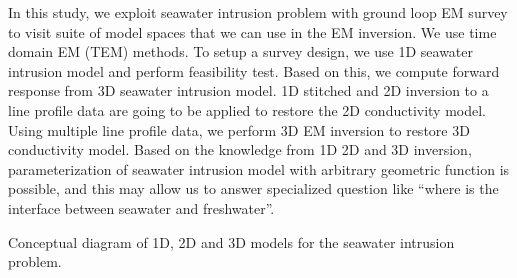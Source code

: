 \documentclass{segabs}
\begin{document}
In this study, we exploit seawater intrusion problem with ground loop EM survey to visit
suite of model spaces that we can use in the EM inversion. We use time domain EM (TEM)
methods. To setup a survey design, we use 1D seawater intrusion model and perform feasibility test. Based on this, we compute forward response from 3D seawater intrusion
model. 1D stitched and 2D inversion to a line profile data are going to be applied to
restore the 2D conductivity model. Using multiple line profile data, we perform 3D EM
inversion to restore 3D conductivity model. Based on the knowledge from 1D 2D and 3D inversion, parameterization of seawater intrusion model with arbitrary geometric function
is possible, and this may allow us to answer specialized question like ``where is the
interface between seawater and freshwater''.


{Conceptual diagram of 1D, 2D and 3D models for the seawater intrusion problem.}
\end{document}
